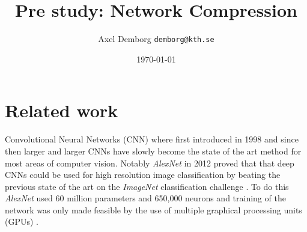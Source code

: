 \documentclass[11pt]{article}
\author{Axel Demborg \texttt{demborg@kth.se}}
\date{\today}
\title{Pre study: Network Compression}
\newcommand{\bibentry}[1]{\cite{#1}}
\begin{document}
\maketitle

\section*{Related work}
\label{sec:org805a59e}
Convolutional Neural Networks (CNN) where first introduced in 1998 \bibentry{lecun1998gradient} and since then larger and larger CNNs have slowly become the state of the art method for most areas of computer vision. Notably \emph{AlexNet} \bibentry{krizhevsky2012imagenet} in 2012 proved that that deep CNNs could be used for high resolution image classification by beating the previous state of the art \bibentry{sanchez2011high} on the \emph{ImageNet} classification challenge \bibentry{deng2009imagenet}. To do this \emph{AlexNet} used 60 million parameters and 650,000 neurons and training of the network was only made feasible by the use of multiple graphical processing units (GPUs) \bibentry{krizhevsky2012imagenet}. 
\end{document}

